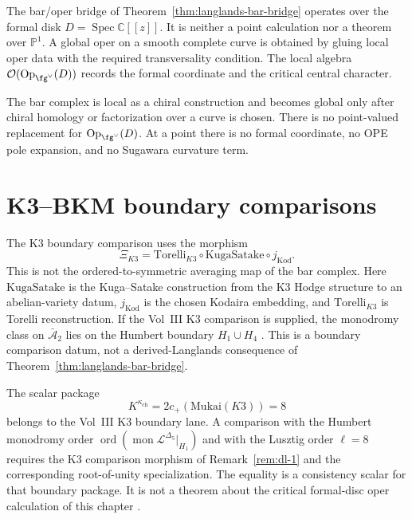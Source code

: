\begin{remark}
\label{rem:dl-critical-level-discipline}

The bar/oper bridge of Theorem~\ref{thm:langlands-bar-bridge}
operates over the formal disk $D=\operatorname{Spec}\mathbb C[\![z]\!]$.
It is neither a point calculation nor a theorem over
$\mathbb P^1$. A global oper on a smooth complete curve is obtained
by gluing local oper data with the required transversality condition.
The local algebra $\mathcal O(\mathrm{Op}_{\fg^\vee}(D))$ records the
formal coordinate and the critical central character.

The bar complex is local as a chiral construction and becomes global
only after chiral homology or factorization over a curve is chosen.
There is no point-valued replacement for
$\mathrm{Op}_{\fg^\vee}(D)$.
At a point there is no formal coordinate, no OPE pole expansion, and
no Sugawara curvature term.
\end{remark}

\section{K3--BKM boundary comparisons}
\label{sec:dl-supplement}

\begin{remark}
\label{rem:dl-1}
The K3 boundary comparison uses the morphism
\[
 \Xi_{K3}
 =
 \mathrm{Torelli}_{K3}\circ\mathrm{KugaSatake}\circ j_{\mathrm{Kod}}.
\]
This is not the ordered-to-symmetric averaging map of the bar complex.
Here $\mathrm{KugaSatake}$ is the Kuga--Satake construction from the
K3 Hodge structure to an abelian-variety datum, $j_{\mathrm{Kod}}$ is
the chosen Kodaira embedding, and $\mathrm{Torelli}_{K3}$ is Torelli
reconstruction. If the Vol~III K3 comparison is supplied, the
monodromy class on $\bar{\mathcal A}_2$ lies on the Humbert boundary
$H_1\cup H_4$ \cite{KugaSatake1967,Mukai1987,Bruinier2002}. This is a
boundary comparison datum, not a derived-Langlands consequence of
Theorem~\ref{thm:langlands-bar-bridge}.
\end{remark}

\begin{remark}
\label{rem:dl-2}
The scalar package
\[
 K^{\kappa_{\mathrm{ch}}}
 =
 2c_+(\mathrm{Mukai}(K3))
 =
 8
\]
belongs to the Vol~III K3 boundary lane. A comparison with the
Humbert monodromy order
$\operatorname{ord}(\operatorname{mon}\mathcal L^{\Delta_5}|_{H_1})$
and with the Lusztig order $\ell=8$ requires the K3 comparison
morphism of Remark~\ref{rem:dl-1} and the corresponding
root-of-unity specialization. The equality is a consistency scalar
for that boundary package. It is not a theorem about the critical
formal-disc oper calculation of this chapter
\cite{Lusztig1990,Borcherds1998,GritsenkoNikulin1998}.
\end{remark}

